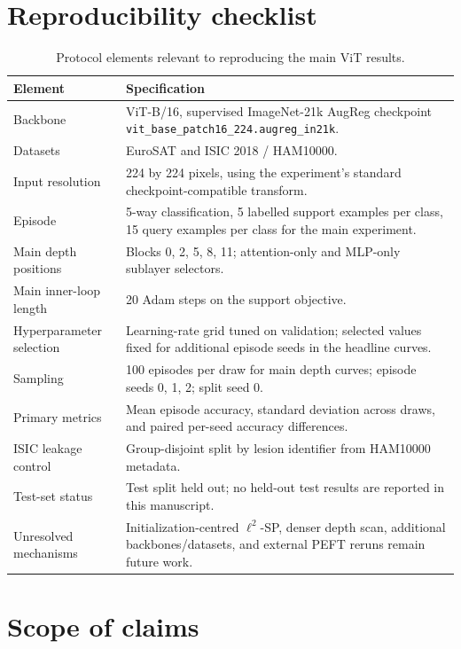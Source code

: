 \documentclass[11pt]{article}
\newcommand{\method}[1]{\texttt{#1}}
\begin{document}
\section{Reproducibility checklist}

\begin{table}[!htbp]
\centering
\small
\caption{Protocol elements relevant to reproducing the main ViT results.}
\label{tab:repro}
\begin{tabularx}{\textwidth}{P{0.28\textwidth}Y}
\toprule
Element & Specification\\
\midrule
Backbone & ViT-B/16, supervised ImageNet-21k AugReg checkpoint \method{vit\_base\_patch16\_224.augreg\_in21k}.\\
Datasets & EuroSAT and ISIC 2018 / HAM10000.\\
Input resolution & 224 by 224 pixels, using the experiment's standard checkpoint-compatible transform.\\
Episode & 5-way classification, 5 labelled support examples per class, 15 query examples per class for the main experiment.\\
Main depth positions & Blocks 0, 2, 5, 8, 11; attention-only and MLP-only sublayer selectors.\\
Main inner-loop length & 20 Adam steps on the support objective.\\
Hyperparameter selection & Learning-rate grid tuned on validation; selected values fixed for additional episode seeds in the headline curves.\\
Sampling & 100 episodes per draw for main depth curves; episode seeds 0, 1, 2; split seed 0.\\
Primary metrics & Mean episode accuracy, standard deviation across draws, and paired per-seed accuracy differences.\\
ISIC leakage control & Group-disjoint split by lesion identifier from HAM10000 metadata.\\
Test-set status & Test split held out; no held-out test results are reported in this manuscript.\\
Unresolved mechanisms & Initialization-centred $\ell^2$-SP, denser depth scan, additional backbones/datasets, and external PEFT reruns remain future work.\\
\bottomrule
\end{tabularx}
\end{table}

\section{Scope of claims}
\end{document}
